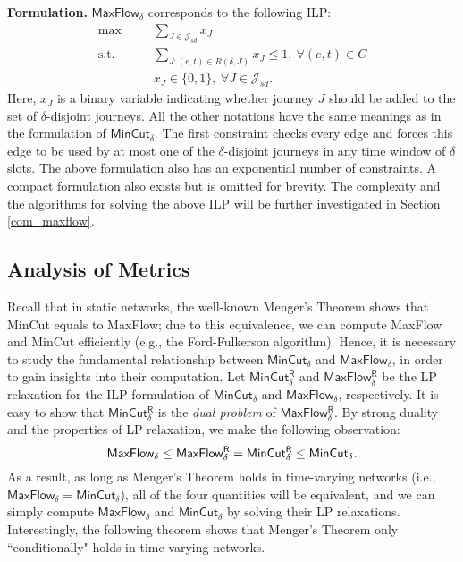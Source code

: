 \documentclass[10pt, conference, letterpaper]{IEEEtran}
\begin{document}
\noindent \textbf{Formulation.} $\mathsf{MaxFlow_{\delta}}$ corresponds to the following ILP:
\[
\begin{split}
\max~~~~~~~~&\sum_{J\in \mathcal{J}_{sd}}x_{J}\\
\text{s.t.}~~~~~~~~&\sum_{J: (e,t)\in R(\delta,J)}x_{J}\le 1,~\forall (e,t)\in C\\
               &x_{J}\in \{0,1\},~\forall J\in \mathcal{J}_{sd}.
\end{split}
\]
Here, $x_J$ is a binary variable indicating whether journey $J$ should be added to the set of $\delta$-disjoint journeys. All the other notations have the same meanings as in the formulation of $\mathsf{MinCut_{\delta}}$. The first constraint checks every edge and forces this edge to be used by at most one of the $\delta$-disjoint journeys in any time window of $\delta$ slots. The above formulation also has an exponential number of constraints. A compact formulation also exists but is omitted for brevity. The complexity and the algorithms for solving the above ILP will be further investigated in Section \ref{com_maxflow}.

\subsection{Analysis of Metrics}\label{ana_metrics}
Recall that in static networks, the well-known Menger's Theorem shows that MinCut equals to MaxFlow; due to this equivalence, we can compute MaxFlow and MinCut efficiently (e.g., the Ford-Fulkerson algorithm). Hence, it is necessary to study the fundamental relationship between $\mathsf{MinCut_{\delta}}$ and $\mathsf{MaxFlow_{\delta}}$, in order to gain insights into their computation. Let $\mathsf{MinCut^R_{\delta}}$ and $\mathsf{MaxFlow^R_{\delta}}$ be the LP relaxation for the ILP formulation of $\mathsf{MinCut_{\delta}}$ and $\mathsf{MaxFlow_{\delta}}$, respectively. It is easy to show that $\mathsf{MinCut^R_{\delta}}$  is the \emph{dual problem} of $\mathsf{MaxFlow^R_{\delta}}$. By strong duality and the properties of LP relaxation, we make the following observation:
\vspace{-2mm}
\[
\mathsf{MaxFlow_{\delta}\le MaxFlow^{R}_{\delta}=MinCut^{R}_{\delta}\le MinCut_{\delta}}.\vspace{-2mm}
\]
As a result, as long as Menger's Theorem holds in time-varying networks (i.e., $\mathsf{MaxFlow_{\delta}= MinCut_{\delta}}$), all of the four quantities will be equivalent, and we can simply compute $\mathsf{MaxFlow_{\delta}}$ and $\mathsf{MinCut_{\delta}}$ by solving their LP relaxations. Interestingly, the following theorem shows that Menger's Theorem only ``conditionally" holds in time-varying networks.
\end{document}

